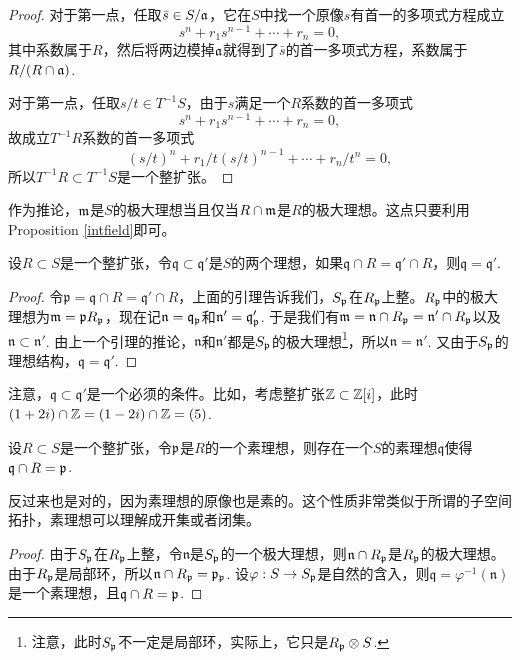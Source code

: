 \begin{proof}
    对于第一点，任取$\bar{s}\in S/\mathfrak{a}$，它在$S$中找一个原像$s$有首一的多项式方程成立
    \[
        s^n+r_1s^{n-1}+\cdots+r_n=0,
    \]
    其中系数属于$R$，然后将两边模掉$\mathfrak{a}$就得到了$\bar{s}$的首一多项式方程，系数属于$R/(R\cap \mathfrak{a})$.

    对于第一点，任取$s/t\in T^{-1}S$，由于$s$满足一个$R$系数的首一多项式
    \[
        s^n+r_1s^{n-1}+\cdots+r_n=0,
    \]
    故成立$T^{-1}R$系数的首一多项式
    \[
        (s/t)^n+r_1/t (s/t)^{n-1}+\cdots+ r_n/t^n=0,
    \]
    所以$T^{-1}R\subset T^{-1}S$是一个整扩张。
\end{proof}

作为推论，$\mathfrak{m}$是$S$的极大理想当且仅当$R\cap \mathfrak{m}$是$R$的极大理想。这点只要利用Proposition \ref{intfield}即可。

\begin{pro}
    设$R\subset S$是一个整扩张，令$\mathfrak{q}\subset \mathfrak{q'}$是$S$的两个理想，如果$\mathfrak{q}\cap R=\mathfrak{q}'\cap R$，则$\mathfrak{q}=\mathfrak{q}'$.
\end{pro}

\begin{proof}
    令$\mathfrak{p}=\mathfrak{q}\cap R=\mathfrak{q}'\cap R$，上面的引理告诉我们，$S_{\mathfrak{p}}$在$R_{\mathfrak{p}}$上整。$R_{\mathfrak{p}}$中的极大理想为$\mathfrak{m}=\mathfrak{p} R_{\mathfrak{p}}$，现在记$\mathfrak{n}=\mathfrak{q}_{\mathfrak{p}}$和$\mathfrak{n}'=\mathfrak{q}'_{\mathfrak{p}}$. 于是我们有$\mathfrak{m}=\mathfrak{n}\cap R_{\mathfrak{p}}=\mathfrak{n}'\cap R_{\mathfrak{p}}$以及$\mathfrak{n}\subset \mathfrak{n}'$. 由上一个引理的推论，$\mathfrak{n}$和$\mathfrak{n}'$都是$S_{\mathfrak{p}}$的极大理想\footnote{注意，此时$S_{\mathfrak{p}}$不一定是局部环，实际上，它只是$R_{\mathfrak{p}}\otimes S$.}，所以$\mathfrak{n}=\mathfrak{n}'$. 又由于$S_{\mathfrak{p}}$的理想结构，$\mathfrak{q}=\mathfrak{q'}$.
\end{proof}

注意，$\mathfrak{q}\subset \mathfrak{q'}$是一个必须的条件。比如，考虑整扩张$\mathbb{Z}\subset \mathbb{Z}[i]$，此时$(1+2i)\cap \mathbb{Z}=(1-2i)\cap \mathbb{Z} =(5)$.

\begin{pro}
    设$R\subset S$是一个整扩张，令$\mathfrak{p}$是$R$的一个素理想，则存在一个$S$的素理想$\mathfrak{q}$使得$\mathfrak{q}\cap R=\mathfrak{p}$.
\end{pro}

反过来也是对的，因为素理想的原像也是素的。这个性质非常类似于所谓的子空间拓扑，素理想可以理解成开集或者闭集。

\begin{proof}
    由于$S_{\mathfrak{p}}$在$R_{\mathfrak{p}}$上整，令$\mathfrak{n}$是$S_{\mathfrak{p}}$的一个极大理想，则$\mathfrak{n}\cap R_{\mathfrak{p}}$是$R_{\mathfrak{p}}$的极大理想。由于$R_{\mathfrak{p}}$是局部环，所以$\mathfrak{n}\cap R_{\mathfrak{p}}=\mathfrak{p}_{\mathfrak{p}}$. 设$\varphi:S\to S_{\mathfrak{p}}$是自然的含入，则$\mathfrak{q}=\varphi^{-1}(\mathfrak{n})$是一个素理想，且$\mathfrak{q}\cap R=\mathfrak{p}$.
\end{proof}

